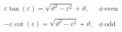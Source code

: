 \begin{equation}
\begin{array}{cc}
\varepsilon \tan \left( \varepsilon \right) =\sqrt{\vartheta
^{2}-\varepsilon ^{2}}+\vartheta , & \phi \ \textrm{even} \\
&  \\
-\varepsilon \cot \left( \varepsilon \right) =\sqrt{\vartheta ^{2}-\varepsilon
^{2}}+\vartheta , & \phi \ \textrm{odd}
\end{array}
\label{eq100}
\end{equation}

